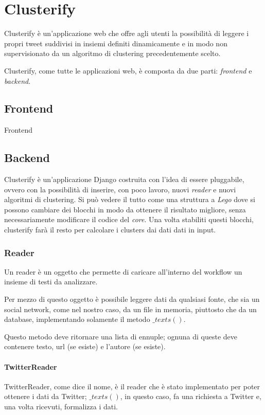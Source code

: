 \chapter{Clusterify}
	Clusterify è un'applicazione web che offre agli utenti la possibilità di leggere i propri tweet suddivisi in insiemi definiti dinamicamente e in modo non supervisionato da un algoritmo di clustering precedentemente scelto.

	Clusterify, come tutte le applicazioni web, è composta da due parti: \emph{frontend} e \emph{backend}.

\section{Frontend}
	Frontend

\section{Backend}
	Clusterify è un'applicazione Django\cite{django_project} costruita con l'idea di essere pluggabile, ovvero con la possibilità di inserire, con poco lavoro, nuovi \emph{reader} e nuovi algoritmi di clustering. Si può vedere il tutto come una struttura a \emph{Lego} dove si possono cambiare dei blocchi in modo da ottenere il risultato migliore, senza necessariamente modificare il codice del \emph{core}. Una volta stabiliti questi blocchi, clusterify farà il resto per calcolare i clusters dai dati dati in input.

	\subsection{Reader}
		Un reader è un oggetto che permette di caricare all'interno del workflow un insieme di testi da analizzare.

		Per mezzo di questo oggetto è possibile leggere dati da qualsiasi fonte, che sia un social network, come nel nostro caso, da un file in memoria, piuttosto che da un database, implementando solamente il metodo $\_texts()$.

		Questo metodo deve ritornare una lista di ennuple; ognuna di queste deve contenere testo, url (se esiste) e l'autore (se esiste).

		\subsubsection{TwitterReader}
			TwitterReader, come dice il nome, è il reader che è stato implementato per poter ottenere i dati da Twitter; $\_texts()$, in questo caso, fa una richiesta a Twitter e, una volta ricevuti, formalizza i dati.

